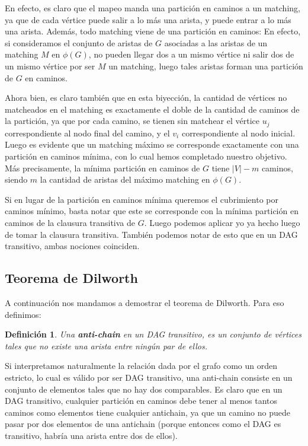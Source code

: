 \documentclass{article}
\newtheorem{definicion}{{\sc Definición}}
\begin{document}
En efecto, es claro que el mapeo manda una partición en caminos a un matching, ya que de cada vértice puede salir a lo más una arista,
y puede entrar a lo más una arista. Además, todo matching viene de una partición en caminos: En efecto, si consideramos el conjunto
de aristas de $G$ asociadas a las aristas de un matching $M$ en $\phi(G)$, no pueden llegar dos a un mismo vértice ni salir dos de un mismo
vértice por ser $M$ un matching, luego tales aristas forman una partición de $G$ en caminos.

Ahora bien, es claro también que en esta biyección, la cantidad de vértices no matcheados en el matching es exactamente el doble de la cantidad
de caminos de la partición, ya que por cada camino, se tienen sin matchear el vértice $u_j$ correspondiente al nodo final del camino, y el $v_i$
correspondiente al nodo inicial. Luego es evidente que un matching máximo se corresponde exactamente con una partición en caminos mínima,
con lo cual hemos completado nuestro objetivo. Más precisamente, la mínima partición en caminos de $G$ tiene $|V| - m$ caminos, siendo $m$
la cantidad de aristas del máximo matching en $\phi(G)$.

Si en lugar de la partición en caminos mínima queremos el cubrimiento por caminos mínimo, basta notar que este se corresponde con
la mínima partición en caminos de la clausura transitiva de $G$. Luego podemos aplicar yo ya hecho luego de tomar la clausura transitiva.
También podemos notar de esto que en un DAG transitivo, ambas nociones coinciden.

\subsection{Teorema de Dilworth}

A continuación nos mandamos a demostrar el teorema de Dilworth. Para eso definimos:

\begin{definicion}
Una \textbf{anti-chain} en un DAG transitivo, es un conjunto de vértices tales que no existe una arista entre ningún par de ellos.
\end{definicion}

Si interpretamos naturalmente la relación dada por el grafo como un orden estricto, lo cual es válido por ser DAG transitivo, una
anti-chain consiste en un conjunto de elementos tales que no hay dos comparables. Es claro que en un DAG transitivo, cualquier
partición en caminos debe tener al menos tantos caminos como elementos tiene cualquier antichain, ya que un camino no puede pasar
por dos elementos de una antichain (porque entonces como el DAG es transitivo, habría una arista entre dos de ellos).
\end{document}

